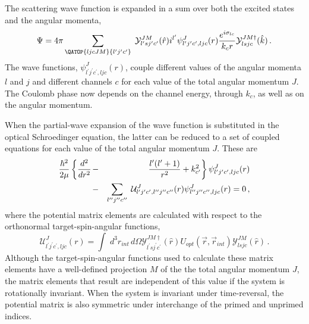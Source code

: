 The scattering wave function is expanded in a sum over both the excited
states and the angular momenta,
\begin{equation}
\Psi=4\pi\sum_{{{\QATOP{ljcJM}{l^{\prime}j^{\prime}c^{\prime}}}}}\;{\mathcal{%
Y}}_{l^{\prime}sj^{\prime}c^{\prime}}^{JM}(\hat{r})i^{l^{\prime}}\psi_{l^{%
\prime}j^{\prime}c^{\prime},ljc}^{J}(r)\frac{e^{i\sigma_{lc}}}{k_{c}r}{%
\mathcal{Y}}_{lsjc}^{JM\dagger}(\hat{k})\,.  \label{cpar}
\end{equation}
The wave functions, $\psi_{l^{\prime}j^{\prime}c^{\prime},ljc}^{J}(r)$,
couple different values of the angular momenta $l$ and $j$ and different
channels $c$ for each value of the total angular momentum $J$. The Coulomb
phase now depends on the channel energy, through $k_{c}$, as well as on the
angular momentum.

When the partial-wave expansion of the wave function is substituted in the
optical Schroedinger equation, the latter can be reduced to a set of coupled
equations for each value of the total angular momentum $J$. These are
\begin{eqnarray}
\frac{\hbar^{2}}{2\mu}\left\{ \frac{d^{2}}{dr^{2}}\right. & - & \left.\frac{%
l^{\prime}(l^{\prime}+1)}{r^{2}}+k_{c^{\prime}}^{2}\right\}
\psi_{l^{\prime}j^{\prime}c^{\prime},ljc}^{J}(r) \\
& - & \sum_{l^{\prime\prime}j^{\prime\prime}c^{\prime\prime}}\;{\mathcal{U}}%
_{l^{\prime}j^{\prime}c^{\prime},l^{\prime\prime}j^{\prime\prime}c^{\prime%
\prime}}^{J}(r)\psi_{l^{\prime\prime}j^{\prime\prime}c^{\prime%
\prime},ljc}^{J}(r)=0\,,  \notag
\end{eqnarray}
where the potential matrix elements are calculated with respect to the
orthonormal target-spin-angular functions,
\begin{equation}
{\mathcal{U}}_{l^{\prime}j^{\prime}c^{\prime},ljc}^{J}(r)=\int\;
d^{3}r_{int}\, d\Omega{\mathcal{Y}}_{l^{\prime}sj^{\prime}c^{\prime}}^{JM%
\dagger}(\hat{r})U_{opt}(\vec{r},\vec{r}_{int}){\mathcal{Y}}_{lsjc}^{JM}(%
\hat{r})\,.  \label{uljc}
\end{equation}
Although the target-spin-angular functions used to calculate these matrix
elements have a well-defined projection $M$ of the the total angular
momentum $J$, the matrix elements that result are independent of this value
if the system is rotationally invariant. When the system is invariant under
time-reversal, the potential matrix is also symmetric under interchange of
the primed and unprimed indices.

